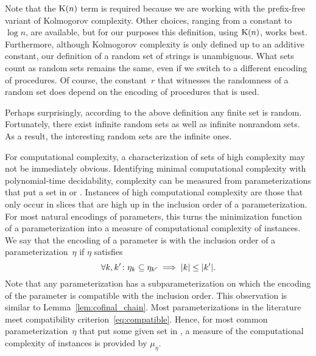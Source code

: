 Note that the $\operatorname{K}(n)$ term is required because we are working with the prefix-free variant of Kolmogorov complexity.
Other choices, ranging from a constant to $\log n$, are available, but for our purposes this definition, using $\operatorname{K}(n)$, works best.
Furthermore, although Kolmogorov complexity is only defined up to an additive constant, our definition of a random set of strings is unambiguous.
What sets count as random sets remains the same, even if we switch to a different encoding of procedures.
Of course, the constant~$r$ that witnesses the randomness of a random set does depend on the encoding of procedures that is used.

Perhaps surprisingly, according to the above definition any finite set is random.
Fortunately, there exist infinite random sets as well as infinite nonrandom sets.
As a result, the interesting random sets are the infinite ones.

For computational complexity, a characterization of sets of high complexity may not be immediately obvious.
Identifying minimal computational complexity with polynomial-time decidability, complexity can be measured from parameterizations that put a set in  or .
Instances of high computational complexity are those that only occur in slices that are high up in the inclusion order of a parameterization.
For most natural encodings of parameters, this turns the minimization function of a parameterization into a measure of computational complexity of instances.
We say that the encoding of a parameter is  with the inclusion order of a parameterization~$\eta$ if $\eta$ satisfies
\begin{equation}
\label{eq:compatible}
  \forall k, k'\colon \eta_k \subseteq \eta_{k'} \implies {\lvert k\rvert} \le {\lvert k'\rvert}.
\end{equation}
Note that any parameterization has a subparameterization on which the encoding of the parameter is compatible with the inclusion order.
This observation is similar to Lemma~\ref{lem:cofinal_chain}.
Most parameterizations in the literature \parencite[e.g.][]{downey1999parameterized,flum2006parameterized,niedermeier2006invitation,cygan2015parameterized} meet compatibility criterion~\eqref{eq:compatible}.
Hence, for most common parameterization~$\eta$ that put some given set in , a measure of the computational complexity of instances is provided by $\mu_\eta$.

